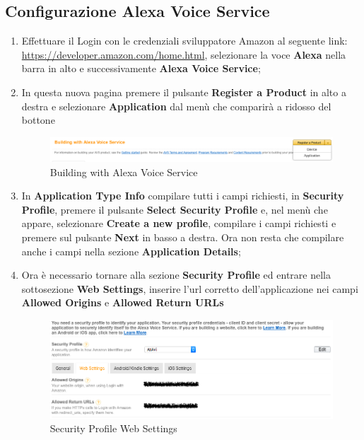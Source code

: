 \documentclass[../ManualeSviluppatore_v1.0.0.tex]{subfiles}
\begin{document}
	\subsection{Configurazione Alexa Voice Service}
		\begin{enumerate}
			\item Effettuare il Login con le credenziali sviluppatore Amazon al seguente link: \url{https://developer.amazon.com/home.html}, selezionare la voce \textbf{Alexa} nella barra in alto e successivamente \textbf{Alexa Voice Service};
			\item In questa nuova pagina premere il pulsante \textbf{Register a Product} in alto a destra e selezionare \textbf{Application} dal menù che comparirà a ridosso del bottone
				\begin{figure}[!h]
					\centering
					\includegraphics[width=\textwidth]{Screenshot/AVS/Application.png}
					\caption{Building with Alexa Voice Service}
				\end{figure}
			\item In \textbf{Application Type Info} compilare tutti i campi richiesti, in \textbf{Security Profile}, premere il pulsante \textbf{Select Security Profile} e, nel menù che appare, selezionare \textbf{Create a new profile}, compilare i campi richiesti e premere sul pulsante \textbf{Next} in basso a destra. Ora non resta che compilare anche i campi nella sezione \textbf{Application Details};
			\item Ora è necessario tornare alla sezione \textbf{Security Profile} ed entrare nella sottosezione \textbf{Web Settings}, inserire l'url corretto dell'applicazione \atavi nei campi \textbf{Allowed Origins} e \textbf{Allowed Return URLs}
				\begin{figure}[!h]
					\centering
					\includegraphics[width=\textwidth]{Screenshot/AVS/SecurityProfile.png}
					\caption{Security Profile \- Web Settings}
				\end{figure}
		\end{enumerate}
\end{document}
